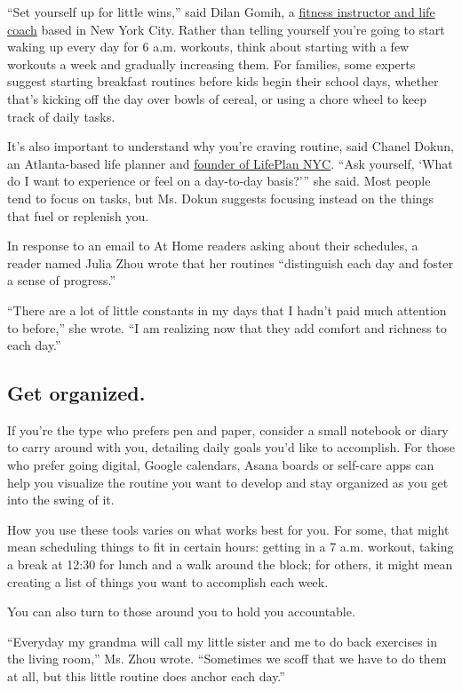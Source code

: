``Set yourself up for little wins,'' said Dilan Gomih, a
\href{https://www.dilangomih.com/}{fitness instructor and life coach}
based in New York City. Rather than telling yourself you're going to
start waking up every day for 6 a.m. workouts, think about starting with
a few workouts a week and gradually increasing them. For families, some
experts suggest starting breakfast routines before kids begin their
school days, whether that's kicking off the day over bowls of cereal, or
using a chore wheel to keep track of daily tasks.

It's also important to understand why you're craving routine, said
Chanel Dokun, an Atlanta-based life planner and
\href{http://www.chaneldokun.com}{founder of LifePlan NYC}. ``Ask
yourself, `What do I want to experience or feel on a day-to-day
basis?''' she said. Most people tend to focus on tasks, but Ms. Dokun
suggests focusing instead on the things that fuel or replenish you.

In response to an email to At Home readers asking about their schedules,
a reader named Julia Zhou wrote that her routines ``distinguish each day
and foster a sense of progress.''

``There are a lot of little constants in my days that I hadn't paid much
attention to before,'' she wrote. ``I am realizing now that they add
comfort and richness to each day.''

\hypertarget{get-organized}{%
\subsection{Get organized.}\label{get-organized}}

If you're the type who prefers pen and paper, consider a small notebook
or diary to carry around with you, detailing daily goals you'd like to
accomplish. For those who prefer going digital, Google calendars, Asana
boards or self-care apps can help you visualize the routine you want to
develop and stay organized as you get into the swing of it.

How you use these tools varies on what works best for you. For some,
that might mean scheduling things to fit in certain hours: getting in a
7 a.m. workout, taking a break at 12:30 for lunch and a walk around the
block; for others, it might mean creating a list of things you want to
accomplish each week.

You can also turn to those around you to hold you accountable.

``Everyday my grandma will call my little sister and me to do back
exercises in the living room,'' Ms. Zhou wrote. ``Sometimes we scoff
that we have to do them at all, but this little routine does anchor each
day.''


